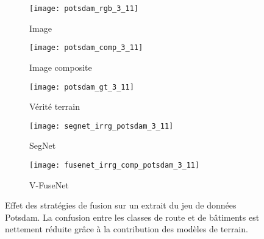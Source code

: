 \begin{figure}[h]
	\begin{subfigure}{0.32\textwidth}
    \texttt{[image: potsdam\_rgb\_3\_11]}
    \caption{Image }
    \end{subfigure}
    \begin{subfigure}{0.32\textwidth}
    \texttt{[image: potsdam\_comp\_3\_11]}
    \caption{Image composite}
    \end{subfigure}
    \begin{subfigure}{0.32\textwidth}
    \texttt{[image: potsdam\_gt\_3\_11]}
    \caption{Vérité terrain}
    \end{subfigure}
    \begin{subfigure}{0.49\textwidth}
    \texttt{[image: segnet\_irrg\_potsdam\_3\_11]}
    \caption{SegNet}
    \end{subfigure}
    \begin{subfigure}{0.49\textwidth}
    \texttt{[image: fusenet\_irrg\_comp\_potsdam\_3\_11]}
    \caption{V-FuseNet}
    \end{subfigure}
    \caption[Effet des stratégies de fusion sur un extrait du jeu de données  Potsdam.]{Effet des stratégies de fusion sur un extrait du jeu de données  Potsdam. La confusion entre les classes de route et de bâtiments est nettement réduite grâce à la contribution des modèles de terrain.\\\isprslegende}
    \label{fig:potsdam_images}
\end{figure}

